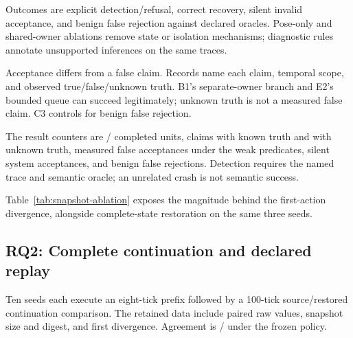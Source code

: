 \documentclass[10pt]{article}
\newcommand{\studyinput}[1]{}
\begin{document}
\begin{table}[t]
\centering\small
\caption{Controlled conformance and ablations. R: CPU FLYNN; F: interface fixture;
F+: fixture with subprocess interruption. I/D/L counts interface detections,
diagnostic comparisons (S1/B2), and study label guards (R1/R2). Recovery reports
successful recoveries/reported flags; C3 alone measures benign false rejection.
Diagnostic divergence is not automatic runtime refusal. Full predicate/truth
and family accounting remain in the artifact.}
\label{tab:fault}\studyinput{fault-matrix}
\end{table}

Outcomes are explicit detection/refusal, correct recovery, silent invalid
acceptance, and benign false rejection against declared oracles. Pose-only and
shared-owner ablations remove state or isolation mechanisms; diagnostic rules
annotate unsupported inferences on the same traces.

Acceptance differs from a false claim. Records name each claim, temporal scope,
and observed true/false/unknown truth. B1's separate-owner branch and E2's bounded
queue can succeed legitimately; unknown truth is not a measured false claim.
C3 controls for benign false rejection.

The result counters are \FaultCompletedUnits{}/\FaultDeclaredUnits{} completed
units, \FaultBaselineKnownClaims{} claims with known truth and
\FaultBaselineUnknownClaims{} with unknown truth, \FaultBaselineFalseAccepts{}
measured false acceptances under the weak predicates,
\FaultSystemSilentAccepts{} silent system acceptances, and
\FaultBenignFalseRejects{} benign false rejections. Detection requires the
named trace and semantic oracle; an unrelated crash is not semantic success.

\begin{table}[t]
\centering\small
\caption{S1's first continuation action after the eight-tick prefix. Absolute
component errors are recomputed from retained paired arrays: velocity command
and relative heading angle. Pose-only
restoration jointly omits continuation state; this ablation does not identify
the contribution of an individual omitted component.}
\label{tab:snapshot-ablation}\studyinput{snapshot-ablation}
\end{table}
Table~\ref{tab:snapshot-ablation} exposes the magnitude behind the first-action
divergence, alongside complete-state restoration on the same three seeds.

\subsection{RQ2: Complete continuation and declared replay}
Ten seeds each execute an eight-tick prefix followed by a 100-tick
source/restored continuation comparison. The retained data include paired raw
values, snapshot size and digest, and first divergence. Agreement is \ContinuationPassed{}/\ContinuationDeclared{}
under the frozen policy.
\end{document}
